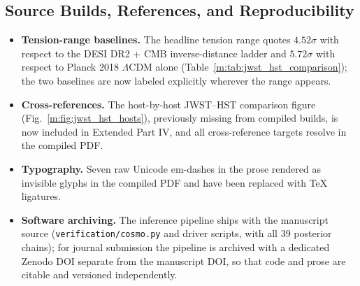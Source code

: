 \documentclass[aps,prd,preprint,superscriptaddress,nofootinbib]{revtex4-2}
\begin{document}
\subsection{Source Builds, References, and Reproducibility}

\begin{itemize}
    \item \textbf{Tension-range baselines.} The headline tension range quotes $4.52\sigma$ with respect to the DESI DR2 + CMB inverse-distance ladder and $5.72\sigma$ with respect to Planck 2018 $\Lambda$CDM alone (Table~\ref{m:tab:jwst_hst_comparison}); the two baselines are now labeled explicitly wherever the range appears.
    \item \textbf{Cross-references.} The host-by-host JWST--HST comparison figure (Fig.~\ref{m:fig:jwst_hst_hosts}), previously missing from compiled builds, is now included in Extended Part IV, and all cross-reference targets resolve in the compiled PDF.
    \item \textbf{Typography.} Seven raw Unicode em-dashes in the prose rendered as invisible glyphs in the compiled PDF and have been replaced with TeX ligatures.
    \item \textbf{Software archiving.} The inference pipeline ships with the manuscript source (\texttt{verification/cosmo.py} and driver scripts, with all 39 posterior chains); for journal submission the pipeline is archived with a dedicated Zenodo DOI separate from the manuscript DOI, so that code and prose are citable and versioned independently.
\end{itemize}
\end{document}
